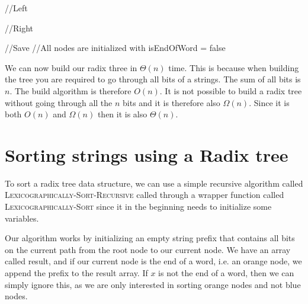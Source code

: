 \documentclass{article}
\newcommand{\method}[1]{\textsc{#1}}
\begin{document}
\begin{center}
	\begin{minipage}{12cm}
		\begin{algorithmic}

			//Left
			\EndIf

			\Else{}
			//Right
			\EndIf

			\EndIf

			\EndFor
			//Save
			 //All nodes are initialized with isEndOfWord = false

			\EndFor
			\EndProcedure
		\end{algorithmic}
	\end{minipage}
\end{center}
We can now build our radix three in $\Theta(n)$ time. This is because when building the tree you are required to go through all bits of a strings. The sum of all bits is $n$. The build algorithm is therefore $O(n)$. It is not possible to build a radix tree without going through all the $n$ bits and it is therefore also $\Omega(n)$. Since it is both $O(n)$ and $\Omega(n)$ then it is also $\Theta(n)$.

\section*{Sorting strings using a Radix tree}

To sort a radix tree data structure, we can use a simple recursive algorithm called \method{Lexicographically-Sort-Recursive} called through a wrapper function called \method{Lexicographically-Sort} since it in the beginning needs to initialize some variables.

\vspace{2mm}

Our algorithm works by initializing an empty string prefix that contains all bits on the current path from the root node to our current node. We have an array called result, and if our current node is the end of a word, i.e. an orange node, we append the prefix to the result array. If $x$ is not the end of a word, then we can simply ignore this, as we are only interested in sorting orange nodes and not blue nodes.
\end{document}
